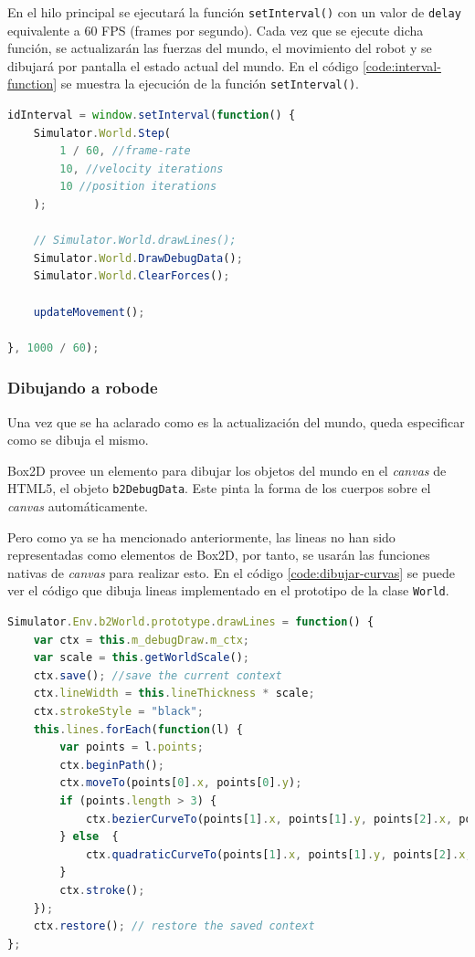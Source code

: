 En el hilo principal se ejecutará la función \texttt{setInterval()} con un valor de \texttt{delay} equivalente a 60 FPS (frames por segundo). Cada vez que se ejecute dicha función, se actualizarán las fuerzas del mundo, el movimiento del robot y se dibujará por pantalla el estado actual del mundo. En el código \ref{code:interval-function} se muestra la ejecución de la función \texttt{setInterval()}.

\begin{lstlisting}[language={Javascript},label={code:interval-function}, caption={Función \texttt{setInterval()} que se ejecutara 60 veces por segundo.}]
idInterval = window.setInterval(function() {
    Simulator.World.Step(
        1 / 60, //frame-rate
        10, //velocity iterations
        10 //position iterations
    );

    // Simulator.World.drawLines();
    Simulator.World.DrawDebugData();
    Simulator.World.ClearForces();

    updateMovement();

}, 1000 / 60);
\end{lstlisting}


\subsubsection{Dibujando a robode}

Una vez que se ha aclarado como es la actualización del mundo, queda especificar como se dibuja el mismo.

Box2D provee un elemento para dibujar los objetos del mundo en el \emph{canvas} de HTML5, el objeto \texttt{b2DebugData}. Este pinta la forma de los cuerpos sobre el \emph{canvas} automáticamente. 

Pero como ya se ha mencionado anteriormente, las lineas no han sido representadas como elementos de Box2D, por tanto, se usarán las funciones nativas de \emph{canvas} para realizar esto. En el código \ref{code:dibujar-curvas} se puede ver el código que dibuja lineas implementado en el prototipo de la clase \texttt{World}.

\begin{lstlisting}[language={Javascript},label={code:dibujar-curvas}, caption={Función que dibuja las curvas de bezier en el \emph{canvas}.}]
Simulator.Env.b2World.prototype.drawLines = function() {
	var ctx = this.m_debugDraw.m_ctx;
	var scale = this.getWorldScale();
	ctx.save(); //save the current context
	ctx.lineWidth = this.lineThickness * scale;
	ctx.strokeStyle = "black";
	this.lines.forEach(function(l) {
		var points = l.points;
		ctx.beginPath();
		ctx.moveTo(points[0].x, points[0].y);
		if (points.length > 3) {
			ctx.bezierCurveTo(points[1].x, points[1].y, points[2].x, points[2].y, points[3].x, points[3].y);
		} else  {
			ctx.quadraticCurveTo(points[1].x, points[1].y, points[2].x, points[2].y);
		}
		ctx.stroke();
	});
	ctx.restore(); // restore the saved context
};
\end{lstlisting}

